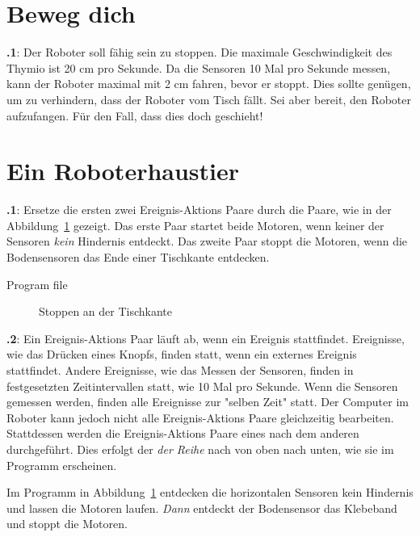 \documentclass[12pt,a4paper,english]{article}
\begin{document}
\section{Beweg dich}

\textbf{\thesection.1}: Der Roboter soll fähig sein zu stoppen. Die maximale Geschwindigkeit des Thymio ist 20 cm pro Sekunde. Da die Sensoren 10 Mal pro Sekunde messen, kann der Roboter maximal mit 2 cm fahren, bevor er stoppt. Dies sollte genügen, um zu verhindern, dass der Roboter vom Tisch fällt. Sei aber bereit, den Roboter aufzufangen. Für den Fall, dass dies doch geschieht!



\section{Ein Roboterhaustier}

\textbf{\thesection.1}: Ersetze die ersten zwei Ereignis-Aktions Paare durch die Paare, wie in der Abbildung~\ref{fig.answer1} gezeigt.
Das erste Paar startet beide Motoren, wenn keiner der Sensoren \emph{kein} Hindernis entdeckt.
Das zweite Paar stoppt die Motoren, wenn die Bodensensoren das Ende einer Tischkante entdecken.


{\raggedleft \hfill Program file }

\begin{figure}[hbt]
\begin{center}
\caption{Stoppen an der Tischkante}\label{fig.answer1}
\end{center}
\end{figure}

\textbf{\thesection.2}: 
Ein Ereignis-Aktions Paar läuft ab, wenn ein Ereignis stattfindet. Ereignisse, wie das Drücken eines Knopfs, finden statt, wenn ein externes Ereignis stattfindet. Andere Ereignisse, wie das Messen der Sensoren, finden in festgesetzten Zeitintervallen statt, wie 10 Mal pro Sekunde. Wenn die Sensoren gemessen werden, finden alle Ereignisse zur "selben Zeit" statt. Der Computer im Roboter kann jedoch nicht alle Ereignis-Aktions Paare gleichzeitig bearbeiten. Stattdessen werden die Ereignis-Aktions Paare eines nach dem anderen durchgeführt. Dies erfolgt der \emph{der Reihe} nach von oben nach unten, wie sie im Programm erscheinen.

Im Programm in Abbildung~\ref{fig.answer1}
entdecken die horizontalen Sensoren kein Hindernis und lassen die Motoren laufen. \emph{Dann} entdeckt der Bodensensor das Klebeband und stoppt die Motoren.
\end{document}
